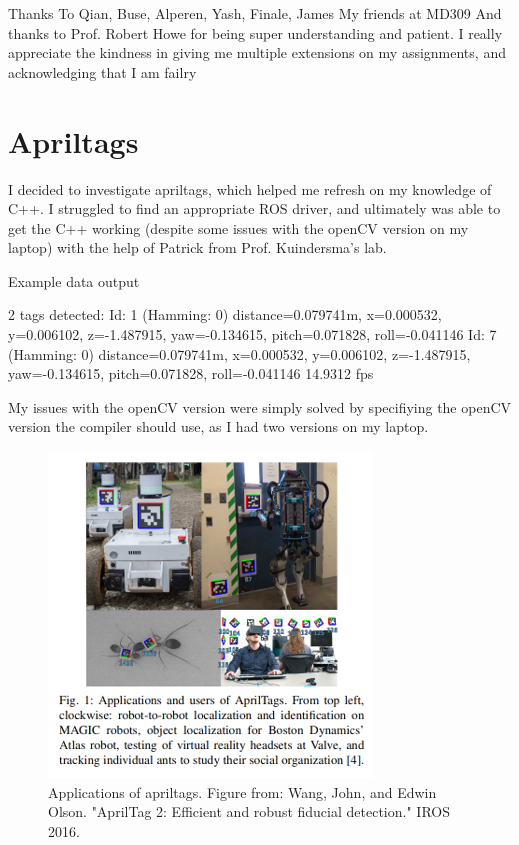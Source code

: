 \documentclass[preprint,12pt,3p]{elsarticle}
\begin{document}
Thanks To Qian, Buse, Alperen, Yash, Finale, James
My friends at MD309
And thanks to Prof. Robert Howe for being super understanding and patient. I really appreciate the kindness in giving me multiple extensions on my assignments, and acknowledging that I am failry  

\newpage
\newpage

\clearpage
\vspace*{\fill}
\begin{center}
\begin{minipage}{.6\textwidth}
\Huge
{}
\normalsize
\end{minipage}
\end{center}
\vfill %
\clearpage

\appendix

\section{Apriltags}
I decided to investigate apriltags, which helped me refresh on my knowledge of C++. I struggled to
find an appropriate ROS driver, and ultimately was able to get the C++ working (despite some issues
with the openCV version on my laptop) with the help of Patrick from Prof. Kuindersma's lab.

Example data output
\begin{ttlisting}
2 tags detected: 
Id: 1 (Hamming: 0) distance=0.079741m, x=0.000532, y=0.006102, z=-1.487915, yaw=-0.134615, pitch=0.071828, roll=-0.041146
Id: 7 (Hamming: 0) distance=0.079741m, x=0.000532, y=0.006102, z=-1.487915, yaw=-0.134615, pitch=0.071828, roll=-0.041146
14.9312 fps
\end{ttlisting}

My issues with the openCV version were simply solved by specifiying the openCV
version the compiler should use, as I had two versions on my laptop.


\begin{figure}[H]
\centering
\includegraphics[width=.4\textwidth]{images/april/applications_april.png}
\caption{Applications of apriltags. Figure from: Wang, John, and Edwin Olson. "AprilTag 2: Efficient and robust fiducial detection." IROS 2016.}
\end{figure}
\end{document}
